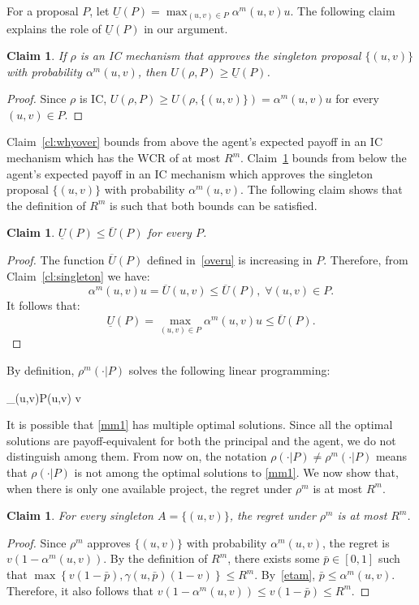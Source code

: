 \documentclass[12pt,english]{article}
\newcommand{\overU}{{\overline{U}}}
\newcommand{\underU}{{\underline{U}}}
\theoremstyle{remark}
\theoremstyle{plain}
\newtheorem{claim}[theorem]{Claim}
\theoremstyle{definition}
\newcommand{\wcr}{\mathrm{WCR}}
\begin{document}
For a proposal $P$, let $\underU(P)=\max_{(u,v)\in P}\alpha^m(u,v)u$.
The following claim explains the role of $\underU(P)$ in our argument.
\begin{claim}\label{cl:whyunder}If $\rho$ is an IC mechanism that approves the singleton proposal $\{(u,v)\}$ with probability $\alpha^m(u,v)$, then $U(\rho,P)\geqslant\underU(P)$.\end{claim}
\begin{proof}Since $\rho$ is IC, $U(\rho,P)\geqslant U(\rho,\{(u,v)\})=\alpha^m(u,v)u$ for every $(u,v)\in P$. \end{proof}
Claim~\ref{cl:whyover} bounds from above the agent's expected payoff in an IC mechanism which has the $\wcr$ of at most $R^m$. Claim~\ref{cl:whyunder} bounds from below the agent's expected payoff in an IC mechanism which approves the singleton proposal $\{(u,v)\}$ with probability $\alpha^m(u,v)$. The following claim shows that the definition of $R^m$ is such that both bounds can be satisfied.
\begin{claim}\label{underover}$\underU(P)\leqslant \overU(P)$ for every $P$.
\end{claim}
\begin{proof}The function $\overU(P)$ defined in~\eqref{overu} is increasing in $P$. Therefore, from Claim~\ref{cl:singleton} we have:  
\[\alpha^m(u,v)u=\overU(u,v)\leqslant \overU(P), \; \forall (u,v) \in P.\]
It follows that: 
\[\underU(P)=\max_{(u,v)\in P}\alpha^m(u,v)u \leqslant\overU(P).\]
\end{proof}
By definition, $\rho^m(\cdot|P)$ solves the following linear programming:
\begin{maxi!}[2]{\pi}{\sum_{(u,v)\in P}\pi(u,v) v} {\label{mm1}} {}\addConstraint{\sum_{(u,v)\in P}\pi(u,v)u}{=\underU(P).\label{mm1const2}}\end{maxi!}

It is possible that \eqref{mm1} has multiple optimal solutions. Since all the optimal solutions are payoff-equivalent for both the principal and the agent, we do not distinguish among them. From now on, the notation $\rho(\cdot|P) \neq \rho^m(\cdot|P)$ means that $\rho(\cdot|P)$ is not among the optimal solutions to \eqref{mm1}. We now show that, when there is only one available project, the regret under $\rho^m$ is at most $R^m$.   
\begin{claim}\label{cl:optimal-singleton}For every singleton $A=\{(u,v)\}$, the regret under $\rho^m$ is at most $R^m$.\end{claim}
\begin{proof}Since $\rho^m$ approves $\{(u,v)\}$ with probability $\alpha^m(u,v)$, the regret is $v(1-\alpha^m(u,v))$. By the definition of $R^m$, there exists some $\bar p \in [0,1]$ such that $\max\left\{v(1-\bar p), \gamma(u,\bar p)(1-v)\right\} \leqslant R^m$. By~\eqref{etam}, $\bar p \leqslant \alpha^m(u,v)$. Therefore, it also follows that $v(1-\alpha^m(u,v))\leqslant v(1-\bar p)\leqslant R^m$.\end{proof}
\end{document}
